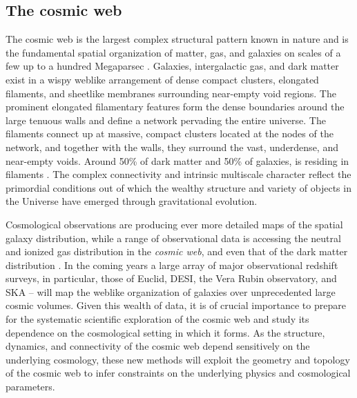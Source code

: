 \documentclass[a4paper, 11pt]{article}
\begin{document}
\subsection{The cosmic web} 
The cosmic web is the largest complex structural pattern known in nature and is the fundamental spatial organization of matter, gas, and galaxies on scales of a few up to a hundred Megaparsec \cite{Shandarin:1989,Bond:1996,Weygaert:2008}. Galaxies, intergalactic gas, and dark matter exist in a wispy weblike arrangement of dense compact clusters, elongated filaments, and sheetlike membranes surrounding
near-empty void regions. The prominent elongated filamentary features form the dense boundaries around the large tenuous walls and define a network pervading the entire universe. The filaments connect up at massive, compact clusters located at the nodes of the network, and together with the walls, they surround the vast, underdense, and near-empty voids. Around 50\% of dark matter and 50\% of galaxies, is residing in filaments \cite[see e.g.][]{Cautun:2014,Ganeshaiah:2019}. The complex connectivity and intrinsic multiscale character reflect the primordial conditions out of which the wealthy structure and variety of objects in the Universe have emerged through gravitational evolution.

Cosmological observations are producing ever more detailed maps of the spatial galaxy distribution, while a range of observational data is accessing the neutral and ionized gas distribution in the \textit{cosmic web}, and even that of the dark matter distribution \cite{Hossen:2022, Kovacs:2022}. In the coming years a large array of major observational redshift surveys, in particular, those of Euclid, DESI, the Vera Rubin observatory, and SKA -- will map the weblike organization of galaxies over unprecedented large cosmic volumes. Given this wealth of data, it is of crucial importance to prepare for the systematic scientific exploration of the cosmic web and study its dependence on the cosmological setting in which it forms.  As the structure, dynamics, and connectivity of the cosmic web depend sensitively on the underlying cosmology, these new methods will exploit the geometry and topology of the cosmic web to infer constraints on the underlying physics and cosmological parameters. 
\end{document}
